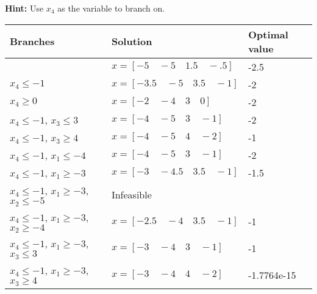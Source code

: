 \documentclass[11pt]{article}
\begin{document}
\noindent\textbf{Hint:} Use $x_4$ as the variable to branch on.
\\
\begin{tabular}{|l|l|l|}
\hline
Branches & Solution & Optimal value \\ \hline
& $x = [-5\quad-5\quad1.5\quad-.5]$ & -2.5 \\ \hline
$x_4 \leq -1$ & $x = [-3.5\quad-5\quad3.5\quad-1]$ & -2\\ \hline
$x_4 \geq 0$ & $x = [-2\quad-4\quad3\quad0]$ & -2 \\ \hline
$x_4 \leq -1$, $x_3 \leq 3$ & $x = [-4\quad-5\quad3\quad-1]$ & -2 \\ \hline
$x_4 \leq -1$, $x_3 \geq 4$ & $x = [-4\quad-5\quad4\quad-2]$ & -1 \\ \hline
$x_4 \leq -1$, $x_1 \leq -4$ & $x = [-4\quad-5\quad3\quad-1]$ & -2 \\ \hline
$x_4 \leq -1$, $x_1 \geq -3$ & $x = [-3\quad-4.5\quad3.5\quad-1]$ & -1.5 \\ \hline
$x_4 \leq -1$, $x_1 \geq -3$, $x_2 \leq -5$ & Infeasible & \\ \hline
$x_4 \leq -1$, $x_1 \geq -3$, $x_2 \geq -4$ & $x = [-2.5\quad-4\quad3.5\quad-1]$ & -1\\ \hline
$x_4 \leq -1$, $x_1 \geq -3$, $x_3 \leq 3$ & $x = [-3\quad-4\quad3\quad-1]$ & -1\\ \hline
$x_4 \leq -1$, $x_1 \geq -3$, $x_3 \geq 4$ & $x = [-3\quad-4\quad4\quad-2]$ & -1.7764e-15\\ \hline
\end{tabular}
\end{document}
